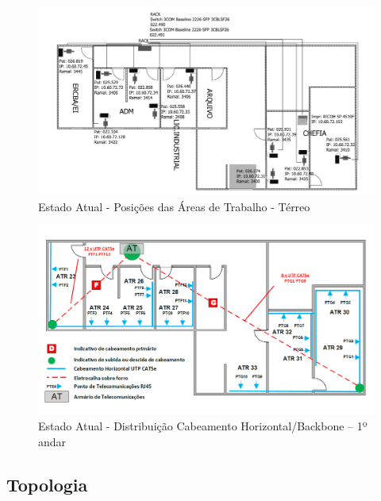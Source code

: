 \documentclass[	DIV=calc,%
							paper=a4,%
							fontsize=12pt,%
							onecolumn]{scrartcl}	 					%
\begin{document}
\begin{figure}[h!]
	\centering
	\includegraphics[width=\textwidth]{figura5.png}
	\caption[Trabalho - Térreo]{Estado Atual - Posições das Áreas de Trabalho - Térreo}
	\label{fig:figura5}
\end{figure}

\begin{figure}[h!]
	\centering
	\includegraphics[width=\textwidth]{figura6.png}
	\caption[Estado Atual - Distribuição Cabeamento Horizontal/Backbone – 1º andar]{Estado Atual - Distribuição Cabeamento Horizontal/Backbone – 1º andar}
	\label{fig:figura6}
\end{figure}

\subsection{Topologia}
\end{document}
